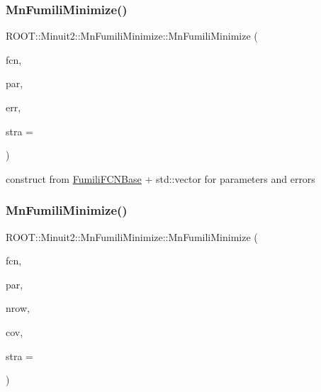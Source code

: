 \subsubsection{\texorpdfstring{MnFumiliMinimize()}{MnFumiliMinimize()}\hspace{0.1cm}{\footnotesize\ttfamily [1/14]}}
{\footnotesize\ttfamily R\+O\+O\+T\+::\+Minuit2\+::\+Mn\+Fumili\+Minimize\+::\+Mn\+Fumili\+Minimize (\begin{DoxyParamCaption}\item[{const \mbox{\hyperlink{classROOT_1_1Minuit2_1_1FumiliFCNBase}{Fumili\+F\+C\+N\+Base}} \&}]{fcn,  }\item[{const std\+::vector$<$ double $>$ \&}]{par,  }\item[{const std\+::vector$<$ double $>$ \&}]{err,  }\item[{unsigned int}]{stra = {} }\end{DoxyParamCaption})\hspace{0.3cm}{\ttfamily [inline]}}



construct from \mbox{\hyperlink{classROOT_1_1Minuit2_1_1FumiliFCNBase}{Fumili\+F\+C\+N\+Base}} + std\+::vector for parameters and errors 

\mbox{\label{classROOT_1_1Minuit2_1_1MnFumiliMinimize_ad12e919e837251ef358a0d461355e51c}} 
\subsubsection{\texorpdfstring{MnFumiliMinimize()}{MnFumiliMinimize()}\hspace{0.1cm}{\footnotesize\ttfamily [2/14]}}
{\footnotesize\ttfamily R\+O\+O\+T\+::\+Minuit2\+::\+Mn\+Fumili\+Minimize\+::\+Mn\+Fumili\+Minimize (\begin{DoxyParamCaption}\item[{const \mbox{\hyperlink{classROOT_1_1Minuit2_1_1FumiliFCNBase}{Fumili\+F\+C\+N\+Base}} \&}]{fcn,  }\item[{const std\+::vector$<$ double $>$ \&}]{par,  }\item[{unsigned int}]{nrow,  }\item[{const std\+::vector$<$ double $>$ \&}]{cov,  }\item[{unsigned int}]{stra = {} }\end{DoxyParamCaption})\hspace{0.3cm}{\ttfamily [inline]}}



